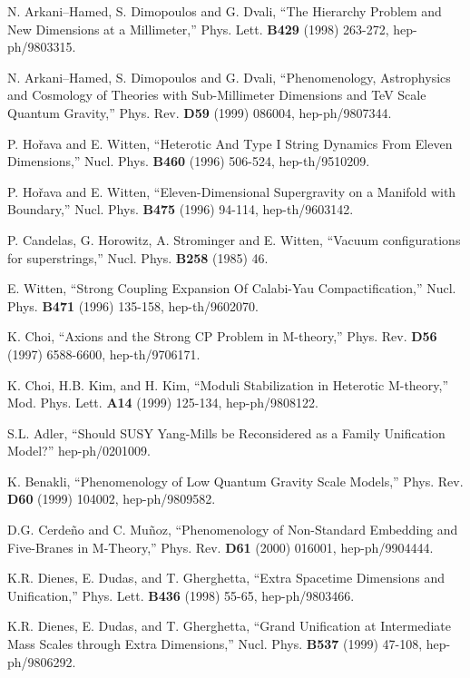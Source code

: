 \documentclass[a4paper,12pt,oneside]{article}
\begin{document}
\begin{thebibliography}{99}

N. Arkani--Hamed, S. Dimopoulos and G. Dvali, ``The Hierarchy 
Problem and New Dimensions at a Millimeter,'' Phys. Lett. 
\textbf{B429} (1998) 263-272, hep-ph/9803315.

N. Arkani--Hamed, S. Dimopoulos and G. Dvali, ``Phenomenology, 
Astrophysics and Cosmology of Theories with Sub-Millimeter 
Dimensions and TeV Scale Quantum Gravity,'' Phys. Rev. \textbf{D59} 
(1999) 086004, hep-ph/9807344.

P. Ho\v{r}ava and E. Witten, ``Heterotic And Type I String Dynamics 
From Eleven Dimensions,'' Nucl. Phys. \textbf{B460} (1996) 506-524, 
hep-th/9510209.

P. Ho\v{r}ava and E. Witten, ``Eleven-Dimensional Supergravity
on a Manifold with Boundary,'' Nucl. Phys. \textbf{B475} (1996) 
94-114, hep-th/9603142.

P. Candelas, G. Horowitz, A. Strominger and E. Witten, ``Vacuum 
configurations for superstrings,'' Nucl. Phys. \textbf{B258} (1985) 
46.

E. Witten, ``Strong Coupling Expansion Of Calabi-Yau 
Compactification,'' Nucl. Phys. \textbf{B471} (1996) 135-158, 
hep-th/9602070.

K. Choi, ``Axions and the Strong CP Problem in M-theory,'' Phys. Rev. \textbf{D56} (1997) 6588-6600, hep-th/9706171.

K. Choi, H.B. Kim, and H. Kim, ``Moduli Stabilization in Heterotic M-theory,'' Mod. Phys. Lett. \textbf{A14} (1999) 125-134, 
hep-ph/9808122.

S.L. Adler, ``Should \coordHE{} SUSY Yang-Mills be Reconsidered
as a Family Unification Model?'' hep-ph/0201009.

K. Benakli, ``Phenomenology of Low Quantum Gravity Scale Models,'' Phys. Rev. \textbf{D60} (1999) 104002, hep-ph/9809582.

D.G. Cerde\~no and C. Mu\~noz, ``Phenomenology of Non-Standard Embedding and Five-Branes in M-Theory,'' Phys. Rev. \textbf{D61} 
(2000) 016001, hep-ph/9904444.

K.R. Dienes, E. Dudas, and T. Gherghetta, ``Extra Spacetime 
Dimensions and Unification,'' Phys. Lett. \textbf{B436} (1998) 
55-65, hep-ph/9803466.

K.R. Dienes, E. Dudas, and T. Gherghetta, ``Grand Unification at 
Intermediate Mass Scales through Extra Dimensions,'' Nucl. Phys. 
\textbf{B537} (1999) 47-108, hep-ph/9806292.


\end{thebibliography}
\end{document}
